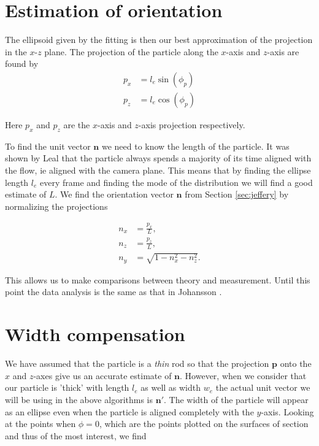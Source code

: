 \section{Estimation of orientation}

The ellipsoid given by the fitting is then our best approximation of the projection in the $x$-$z$ plane. The projection of the particle along the $x$-axis and $z$-axis are found by
\begin{align} \label{eq:project}
p_x  &= l_e \sin(\phi_p) \\
p_z  &= l_e \cos(\phi_p) 
\end{align}

Here $p_x$ and $p_z$ are the $x$-axis and $z$-axis projection respectively.

To find the unit vector $\mathbf{n}$ we need to know the length of the particle. It was shown by Leal \cite{Leal} that the particle always spends a majority of its time aligned with the flow, ie aligned with the camera plane. This means that by finding the ellipse length $l_e$ every frame and finding the mode of the distribution we will find a good estimate of $L$. We find the orientation vector $\mathbf{n}$ from Section \ref{sec:jeffery} by normalizing the projections

\begin{subequations}\label{eq:normalize}
\begin{align}
n_x 	&= \frac{p_x}{L}, \\
n_z 	&= \frac{p_z}{L}, \\
n_y		&= \sqrt{1 - n_x^2 - n_z^2}.
\end{align}
\end{subequations}

This allows us to make comparisons between theory and measurement. Until this point the data analysis is the same as that in Johansson \cite{AntonThesis}.

\section{Width compensation}\label{sec:width_compensation}
We have assumed that the particle is a \emph{thin} rod so that the projection $\mathbf{p}$ onto the $x$ and $z$-axes give us an accurate estimate of $\mathbf{n}$. However, when we consider that our particle is 'thick' with length $l_e$ as well as width $w_e$ the actual unit vector we will be using in the above algorithms is $\mathbf{n}'$. The width of the particle will appear as an ellipse even when the particle is aligned completely with the $y$-axis. Looking at the points when $\phi = 0$, which are the points plotted on the surfaces of section and thus of the most 	interest, we find

